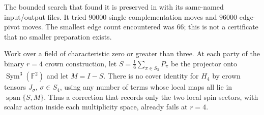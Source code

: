 The bounded search that found it is preserved in
 with its
same-named input/output files.  It tried $90000$ single
complementation moves and $96000$ edge-pivot moves.  The
smallest edge count encountered was $66$; this is not a
certificate that no smaller preparation exists.

\begin{proposition}
\label{prop:cauchy-central-spin-obstruction}
Work over a field of characteristic zero or greater than three.
At each party of the binary $r=4$ crown construction, let
$S=\frac16\sum_{\pi\in S_3}P_\pi$ be the projector onto
$\operatorname{Sym}^3(\mathbb F^2)$ and let $M=I-S$.
There is no cover identity for $H_4$ by crown tensors
$J_\sigma$, $\sigma\in S_4$, using any number of terms whose
local maps all lie in $\operatorname{span}\{S,M\}$.
Thus a correction that records only the two local spin
sectors, with scalar action inside each multiplicity space,
already fails at $r=4$.
\end{proposition}
